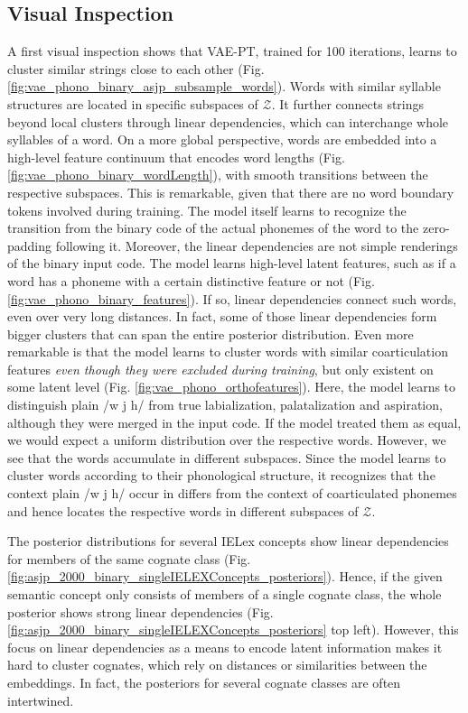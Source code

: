 \documentclass[6pt]{article}
\begin{document}
\subsection{Visual Inspection}
A first visual inspection shows that VAE-PT, trained for 100 iterations, learns to cluster similar strings close to each other (Fig. \ref{fig:vae_phono_binary_asjp_subsample_words}). Words with similar syllable structures are located in specific subspaces of $\mathcal{Z}$. It further connects strings beyond local clusters through linear dependencies, which can interchange whole syllables of a word. 
On a more global perspective, words are embedded into a high-level feature continuum that encodes word lengths (Fig. \ref{fig:vae_phono_binary_wordLength}), with smooth transitions between the respective subspaces. This is remarkable, given that there are no word boundary tokens involved during training. The model itself learns to recognize the transition from the binary code of the actual phonemes of the word to the zero-padding following it.
Moreover, the linear dependencies are not simple renderings of the binary input code. The model learns high-level latent features, such as if a word has a phoneme with a certain distinctive feature or not (Fig. \ref{fig:vae_phono_binary_features}). If so, linear dependencies connect such words, even over very long distances. In fact, some of those linear dependencies form bigger clusters that can span the entire posterior distribution. 
Even more remarkable is that the model learns to cluster words with similar coarticulation features \textit{even though they were excluded during training}, but only existent on some latent level (Fig. \ref{fig:vae_phono_orthofeatures}). Here, the model learns to distinguish plain /w j h/ from true labialization, palatalization and aspiration, although they were merged in the input code. If the model treated them as equal, we would expect a uniform distribution over the respective words. However, we see that the words accumulate in different subspaces. Since the model learns to cluster words according to their phonological structure, it recognizes that the context plain /w j h/ occur in differs from the context of coarticulated phonemes and hence locates the respective words in different subspaces of $\mathcal{Z}$.

The posterior distributions for several IELex concepts show linear dependencies for members of the same cognate class (Fig. \ref{fig:asjp_2000_binary_singleIELEXConcepts_posteriors}). Hence, if the given semantic concept only consists of members of a single cognate class, the whole posterior shows strong linear dependencies (Fig. \ref{fig:asjp_2000_binary_singleIELEXConcepts_posteriors} top left). However, this focus on linear dependencies as a means to encode latent information makes it hard to cluster cognates, which rely on distances or similarities between the embeddings. In fact, the posteriors for several cognate classes are often intertwined. 
\end{document}
